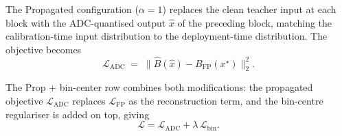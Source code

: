 \documentclass[a4paper,11pt,oneside]{article}
\theoremstyle{breakstyle}
\begin{document}
  The Propagated configuration ($\alpha = 1$) replaces the
  clean teacher input at each block with the ADC-quantised output
  $\hat{x}$ of the preceding block, matching the calibration-time
  input distribution to the deployment-time distribution. The
  objective becomes
  \begin{equation}
      \mathcal{L}_{\mathrm{ADC}}
      \;=\;
      \bigl\| \hat{B}(\hat{x}) - B_{\mathrm{FP}}(x^\star) \bigr\|_2^2.
  \end{equation}

  The Prop + bin-center row combines both modifications: the
  propagated objective $\mathcal{L}_{\mathrm{ADC}}$ replaces
  $\mathcal{L}_{\mathrm{FP}}$ as the reconstruction term, and the
  bin-centre regulariser is added on top, giving
  \begin{equation}
      \mathcal{L} = \mathcal{L}_{\mathrm{ADC}}
                  + \lambda\,\mathcal{L}_{\mathrm{bin}}.
  \end{equation}
\end{document}
